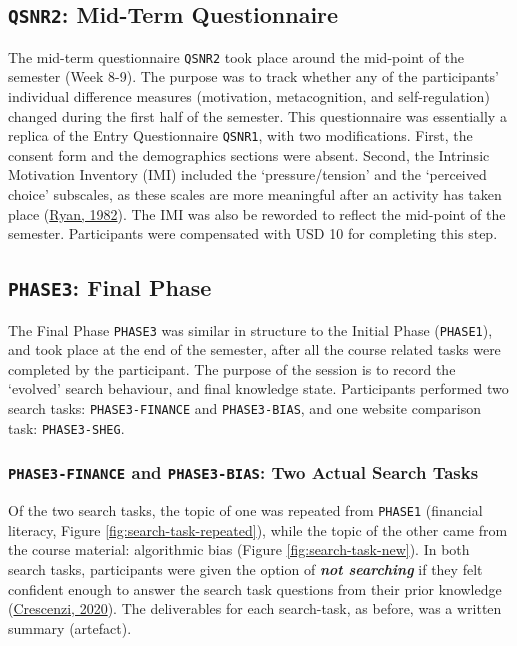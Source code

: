 \documentclass[letterpaper, nobind]{templates/ociamthesis}
\begin{document}
\hypertarget{sec-method-qsnr2}{%
\subsection{\texorpdfstring{\texttt{QSNR2}: Mid-Term Questionnaire}{QSNR2: Mid-Term Questionnaire}}\label{sec-method-qsnr2}}

The mid-term questionnaire \texttt{QSNR2} took place around the mid-point of the semester (Week 8-9).
The purpose was to track whether any of the participants' individual difference measures (motivation, metacognition, and self-regulation) changed during the first half of the semester.
This questionnaire was essentially a replica of the Entry Questionnaire \texttt{QSNR1}, with two modifications. First, the consent form and the demographics sections were absent.
Second, the Intrinsic Motivation Inventory (IMI) included the `pressure/tension' and the `perceived choice' subscales, as these scales are more meaningful after an activity has taken place (\protect\hyperlink{ref-ryan1982control}{Ryan, 1982}).
The IMI was also be reworded to reflect the mid-point of the semester.
Participants were compensated with USD 10 for completing this step.

\hypertarget{sec-method-phase3}{%
\subsection{\texorpdfstring{\texttt{PHASE3}: Final Phase}{PHASE3: Final Phase}}\label{sec-method-phase3}}

The Final Phase \texttt{PHASE3} was similar in structure to the Initial Phase (\texttt{PHASE1}), and took place at the end of the semester, after all the course related tasks were completed by the participant. The purpose of the session is to record the `evolved' search behaviour, and final knowledge state.
Participants performed two search tasks: \texttt{PHASE3-FINANCE} and \texttt{PHASE3-BIAS},
and one website comparison task: \texttt{PHASE3-SHEG}.

\hypertarget{phase3-finance-and-phase3-bias-two-actual-search-tasks}{%
\subsubsection{\texorpdfstring{\texttt{PHASE3-FINANCE} and \texttt{PHASE3-BIAS}: Two Actual Search Tasks}{PHASE3-FINANCE and PHASE3-BIAS: Two Actual Search Tasks}}\label{phase3-finance-and-phase3-bias-two-actual-search-tasks}}

Of the two search tasks, the topic of one was repeated from \texttt{PHASE1} (financial literacy, Figure \ref{fig:search-task-repeated}), while the topic of the other came from the course material: algorithmic bias (Figure \ref{fig:search-task-new}).
In both search tasks, participants were given the option of \textbf{\emph{not searching}} if they felt confident enough to answer the search task questions from their prior knowledge (\protect\hyperlink{ref-crescenzi2020adaptation}{Crescenzi, 2020}).
The deliverables for each search-task, as before, was a written summary (artefact).
\end{document}

